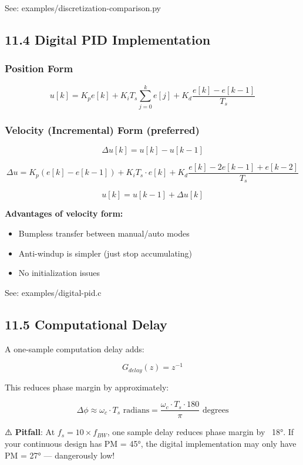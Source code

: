 \documentclass[11pt,a4paper]{book}
\begin{document}
See: examples/discretization-comparison.py

\medskip\noindent\hrulefill\medskip

\subsection{11.4 Digital PID Implementation}

\subsubsection{Position Form}

\[u[k] = K_p e[k] + K_i T_s \sum_{j=0}^{k} e[j] + K_d \frac{e[k] - e[k-1]}{T_s}\]

\subsubsection{Velocity (Incremental) Form (preferred)}

\[\Delta u[k] = u[k] - u[k-1]\]

\[\Delta u = K_p(e[k] - e[k-1]) + K_i T_s \cdot e[k] + K_d \frac{e[k] - 2e[k-1] + e[k-2]}{T_s}\]

\[u[k] = u[k-1] + \Delta u[k]\]

\textbf{Advantages of velocity form:}
\begin{itemize}
\item Bumpless transfer between manual/auto modes
\item Anti-windup is simpler (just stop accumulating)
\item No initialization issues
\end{itemize}

See: examples/digital-pid.c

\medskip\noindent\hrulefill\medskip

\subsection{11.5 Computational Delay}

A one-sample computation delay adds:

\[G_{delay}(z) = z^{-1}\]

This reduces phase margin by approximately:

\[\Delta \phi \approx \omega_c \cdot T_s \text{ radians} = \frac{\omega_c \cdot T_s \cdot 180}{\pi} \text{ degrees}\]

⚠️ \textbf{Pitfall}: At $f_s = 10 \times f_{BW}$, one sample delay reduces phase margin by ~18°. If your continuous design has PM = 45°, the digital implementation may only have PM = 27° — dangerously low!
\end{document}
